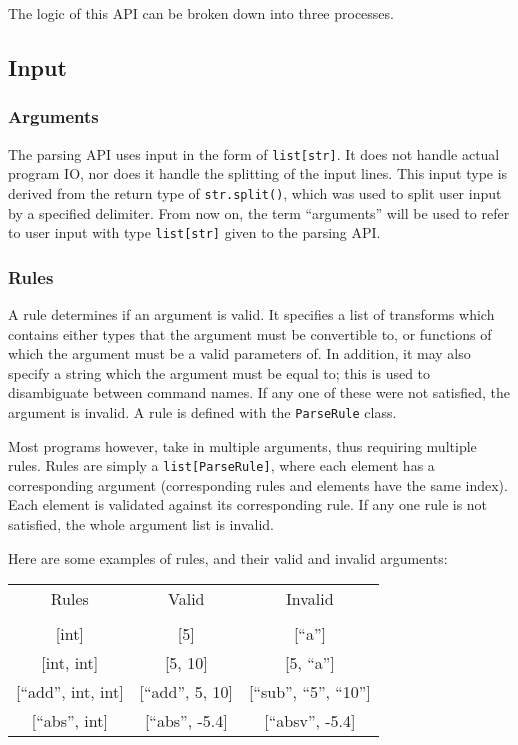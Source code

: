 \documentclass{article}
\begin{document}
		The logic of this API can be broken down into three processes.

		\subsection{Input}
			\subsubsection{Arguments}
				The parsing API uses input in the form of \verb|list[str]|. It does not handle
				actual program IO, nor does it handle the splitting of the input lines. This
				input type is derived from the return type of \verb|str.split()|, which was
				used to split user input by a specified delimiter. From now on, the term
				``arguments'' will be used to refer to user input with type \verb|list[str]|
				given to the parsing API\@.

			\subsubsection{Rules}
				A rule determines if an argument is valid. It specifies a list of transforms which
				contains either types that the argument must be convertible to, or functions of
				which the argument must be a valid parameters of. In addition, it may also specify
				a string which the argument must be equal to; this is used to disambiguate between
				command names. If any one of these were not satisfied, the argument is invalid. A
				rule is defined with the \verb|ParseRule| class.

				Most programs however, take in multiple arguments, thus requiring multiple rules.
				Rules are simply a \verb|list[ParseRule]|, where each element has a corresponding
				argument (corresponding rules and elements have the same index). Each element is
				validated against its corresponding rule. If any one rule is not satisfied, the
				whole argument list is invalid.

				Here are some examples of rules, and their valid and invalid arguments:

				\begin{center}
					\begin{tabular}{c c c}
						Rules & Valid & Invalid \\
						\\
							{[int]} & {[5]} & {[``a'']}
						\\
							{[int, int]} & {[5, 10]} & {[5, ``a'']}
						\\
							{[``add'', int, int]} & {[``add'', 5, 10]} & {[``sub'', ``5'', ``10'']}
						\\
							{[``abs'', int]} & {[``abs'', -5.4]} & {[``absv'', -5.4]}
						\\
					\end{tabular}
				\end{center}
\end{document}
